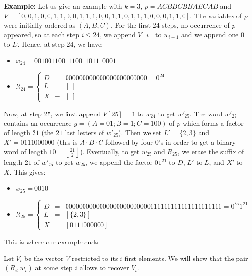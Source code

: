 \documentclass[]{elsart}
\def\floor#1{\left\lfloor #1 \right\rfloor}
\newcommand{\set}[1]{\{#1\}}
\newcounter{example}
\begin{document}
\medskip

\textbf{Example:} Let us give an example with $k=3$, $p=ACBBCBBABCAB$
  and \linebreak
  $V=[0,0,1,0,0,1,1,0,0,1,1,1,0,0,1,1,0,1,1,1,0,0,0,1,1,0]$. The
  variables of $p$ were initially ordered as $(A,B,C)$. For the first
  $24$ steps, no occurrence of $p$ appeared, so at each step $i\le
  24$, we append $V[i]$ to $w_{i-1}$ and we append one $0$ to $D$.
  Hence, at step $24$, we have:
  \begin{itemize}
    \item $w_{24}=001001100111001101110001$ 
    \item $\displaystyle R_{24} =\left\{ 
        \begin{array}{rcl}
          D&=&000000000000000000000000=0^{24}\\ 
          L&=&[\ ]\\ 
          X&=&[\ ]
        \end{array} \right.$
  \end{itemize} 
  Now, at step $25$, we first append $V[25] = 1$ to $w_{24}$ to get
  $w'_{25}$. The word $w'_{25}$ contains an occurrence
  $y=(A=01;B=1;C=100)$ of $p$ which forms a factor of length $21$ (the
  $21$ last letters of $w'_{25}$). Then we set $L'=\set{2,3}$ and $X'=
  0111000000$ (this is $A\cdot B\cdot C$ followed by four $0$'s in order to
  get a binary word of length $10=\floor{\frac{21}{2}}$).
  Eventually, to get $w_{25}$ and $R_{25}$, we erase the suffix of length $21$
  of $w'_{25}$ to get $w_{25}$, we append the factor $01^{21}$ to $D$,
  $L'$ to $L$, and $X'$ to $X$. This gives:
  \begin{itemize}
    \item $w_{25}=0010$ 
    \item $\displaystyle R_{25} =\left\{ 
        \begin{array}{rcl}
          D&=&0000000000000000000000000111111111111111111111=0^{25}1^{21}\\ 
          L&=&[\set{2,3}] \\
          X&=&[0111000000]
        \end{array} \right.$
  \end{itemize}

This is where our example ends.

\medskip

Let $V_i$ be the vector $V$ restricted to its $i$ first elements.
We will show that the pair $(R_i,w_i)$ at some step $i$ allows to recover $V_i$.
\end{document}
